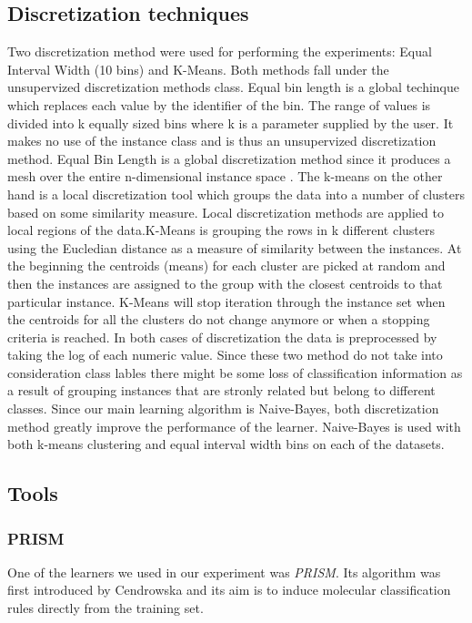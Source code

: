 \documentclass{sig-alternate}
\begin{document}
\subsection{Discretization techniques}
Two discretization method were used for performing the experiments: Equal Interval Width (10 bins) and K-Means. Both methods fall under the unsupervized discretization methods class. Equal bin length is a global techinque which replaces each value by the identifier of the bin. The range of values is divided into k equally sized bins where k is a parameter supplied by the user. It makes no use of the instance class and is thus an unsupervized discretization method. Equal Bin Length is a global discretization  method since it produces a mesh over the entire n-dimensional instance space \cite {dough95}. The k-means on the other hand is a local discretization tool which groups the data into a number of clusters based on some similarity measure. Local discretization methods are applied to local regions of the data.K-Means is grouping the rows in k different clusters using the Eucledian distance as a measure of similarity between the instances. At the beginning the centroids (means) for each cluster are picked at random and then the instances are assigned to the group with the closest centroids to that particular instance. K-Means will stop iteration through the instance set when the centroids for all the clusters do not change anymore or when a stopping criteria is reached. In both cases of discretization the data is preprocessed by taking the log of each numeric value. Since these two method do not take into consideration class lables there might be some loss of classification information as a result of grouping instances that are stronly related but belong to different classes. 
Since our main learning algorithm is Naive-Bayes, both discretization method greatly improve the performance of the learner. Naive-Bayes is used with both k-means clustering and equal interval width bins on each of the datasets.

\subsection{Tools}
\subsubsection{PRISM}
One of the learners we used in our experiment was {\em PRISM}. Its algorithm was first introduced by Cendrowska and its aim is to induce molecular classification rules directly from the training set. 
\end{document}
